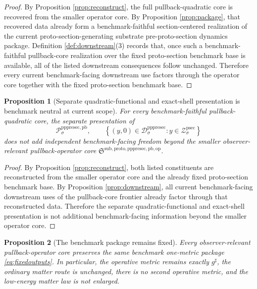 \documentclass[11pt]{article}
\newcommand{\CompletedMetric}{g^{\sharp}}
\newcommand{\ProtoSectionShell}[1]{\mathcal Z_{#1}^{\mathrm{psec}}}
\newcommand{\PrePreProtoSectionResidualBody}[1]{\mathcal D_{#1}^{\mathrm{pppresec}}}
\newcommand{\PrePreProtoSectionPullbackFunctional}[1]{\mathscr P_{#1}^{\mathrm{pppresec,pb}}}
\newcommand{\PullbackOperatorCore}{\mathfrak S^{\mathrm{sub,proto,pppresec,pb,op}}}
\newtheorem{proposition}{Proposition}
\begin{document}
\begin{proof}
By Proposition \ref{prop:reconstruct}, the full pullback-quadratic core is recovered from the smaller operator core. By Proposition \ref{prop:package}, that recovered data already form a benchmark-faithful section-centered realization of the current proto-section-generating substrate pre-proto-section dynamics package. Definition \ref{def:downstream}(3) records that, once such a benchmark-faithful pullback-core realization over the fixed proto-section benchmark base is available, all of the listed downstream consequences follow unchanged. Therefore every current benchmark-facing downstream use factors through the operator core together with the fixed proto-section benchmark base.
\end{proof}

\begin{proposition}[Separate quadratic-functional and exact-shell presentation is benchmark neutral at current scope]
\label{prop:neutral}
For every benchmark-faithful pullback-quadratic core, the separate presentation of
\[
\PrePreProtoSectionPullbackFunctional{\sigma},
\qquad
\left\{
(y,0)\in\PrePreProtoSectionResidualBody{\sigma}:y\in\ProtoSectionShell{\sigma}
\right\}
\]
does not add independent benchmark-facing freedom beyond the smaller observer-relevant pullback-operator core \(\PullbackOperatorCore\).
\end{proposition}

\begin{proof}
By Proposition \ref{prop:reconstruct}, both listed constituents are reconstructed from the smaller operator core and the already fixed proto-section benchmark base. By Proposition \ref{prop:downstream}, all current benchmark-facing downstream uses of the pullback-core frontier already factor through that reconstructed data. Therefore the separate quadratic-functional and exact-shell presentation is not additional benchmark-facing information beyond the smaller operator core.
\end{proof}

\begin{proposition}[The benchmark package remains fixed]
\label{prop:benchmark}
Every observer-relevant pullback-operator core preserves the same benchmark one-metric package \eqref{eq:fixedoutputs}. In particular, the operative metric remains exactly \(\CompletedMetric\), the ordinary matter route is unchanged, there is no second operative metric, and the low-energy matter law is not enlarged.
\end{proposition}
\end{document}
